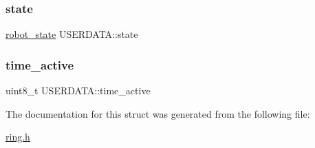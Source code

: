 \mbox{\label{struct_u_s_e_r_d_a_t_a_aeed785c38cdfd9bc4356b47287f4cc33}} 
\subsubsection{\texorpdfstring{state}{state}}
{\footnotesize\ttfamily \hyperlink{ring_8h_a69b20b1a04c8e4cf3b72851b966259ec}{robot\+\_\+state} U\+S\+E\+R\+D\+A\+T\+A\+::state}

\mbox{\label{struct_u_s_e_r_d_a_t_a_ac7d7ea7ea2501228ad03e408fd68c1cf}} 
\subsubsection{\texorpdfstring{time\+\_\+active}{time\_active}}
{\footnotesize\ttfamily uint8\+\_\+t U\+S\+E\+R\+D\+A\+T\+A\+::time\+\_\+active}



The documentation for this struct was generated from the following file\+:\begin{DoxyCompactItemize}
\item 
\hyperlink{ring_8h}{ring.\+h}\end{DoxyCompactItemize}
